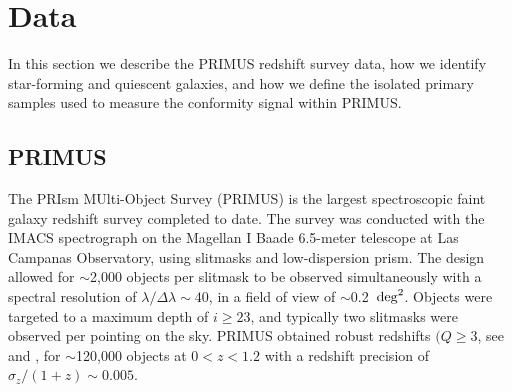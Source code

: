 
\section{Data}\label{sec:data}

In this section we describe the PRIMUS redshift survey data, how we identify star-forming
and quiescent galaxies, and how we define the isolated primary samples used to measure 
the conformity signal within PRIMUS.


\subsection{PRIMUS}\label{sec:PRIMUS}
 
The PRIsm MUlti-Object Survey (PRIMUS) is the largest spectroscopic faint galaxy redshift survey completed to date.
The survey was conducted with the IMACS spectrograph \citep{Bigelow03} on the Magellan I Baade 6.5-meter telescope at 
Las Campanas 
Observatory, using slitmasks and low-dispersion prism.
The design allowed for $\sim$2,000 objects per slitmask to be observed simultaneously with a spectral resolution of ${\lambda/\Delta
\lambda \sim 40}$, in 
a field of view of $\sim$0.2~$\degsq$.
Objects were targeted to a maximum depth of ${i \ge 23}$, and typically two slitmasks were observed per pointing on the sky.  
PRIMUS obtained robust redshifts $({Q \ge 3}$, see \citet{Coil11} and \citet{Cool13}, for $\sim$120,000 objects at ${0<z<1.2}$ with a 
redshift precision of ${\sigma_{z}/(1 + z) \sim 0.005}$.

